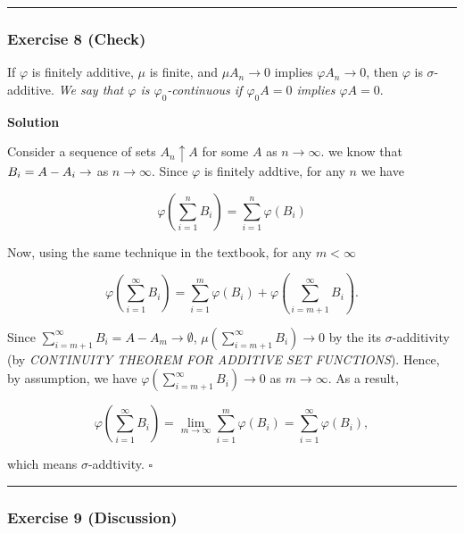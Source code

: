 \documentclass[
]{article}
\begin{document}
\begin{center}\rule{0.5\linewidth}{0.5pt}\end{center}

\hypertarget{exercise-8-check}{%
  \subsubsection{Exercise 8 (Check)}\label{exercise-8-check}}

If \(\varphi\) is finitely additive, \(\mu\) is finite, and
\(\mu A_n \rightarrow 0\) implies \(\varphi A_n \rightarrow 0\), then
\(\varphi\) is \(\sigma\)-additive. \emph{We say that \(\varphi\) is
  \(\varphi_0\)-continuous if \(\varphi_0 A=0\) implies \(\varphi A=0\)}.

\textbf{Solution}

Consider a sequence of sets \(A_n \uparrow A\) for some \(A\) as
\(n\to \infty\). we know that \(B_i = A - A_i \to \empty\) as
\(n\to \infty\). Since \(\varphi\) is finitely addtive, for any \(n\) we
have

\[\varphi\left(\sum_{i=1}^n B_i \right) = \sum_{i=1}^n \varphi(B_i)\]

Now, using the same technique in the textbook, for any \(m < \infty\)

\[\varphi\left(\sum_{i=1}^\infty B_i\right) = \sum_{i=1}^m \varphi(B_i) + \varphi\left(\sum_{i = m+1}^\infty B_i\right).\]

Since \(\sum_{i = m+1}^\infty B_i = A - A_{m} \to \emptyset\),
\(\mu\left(\sum_{i = m+1}^\infty B_i\right) \to 0\) by the its
\(\sigma\)-additivity (by \emph{CONTINUITY THEOREM FOR ADDITIVE SET
  FUNCTIONS}). Hence, by assumption, we have
\(\varphi\left(\sum_{i = m+1}^\infty B_i\right) \to 0\) as
\(m\to \infty\). As a result,

\[\varphi\left(\sum_{i=1}^\infty B_i\right) = \lim_{m\to \infty} \sum_{i=1}^m \varphi(B_i) = \sum_{i=1}^\infty \varphi(B_i),\]

which means \(\sigma\)-addtivity. \(\square\)

\begin{center}\rule{0.5\linewidth}{0.5pt}\end{center}

\hypertarget{exercise-9-discussion}{%
  \subsubsection{Exercise 9 (Discussion)}\label{exercise-9-discussion}}
\end{document}
